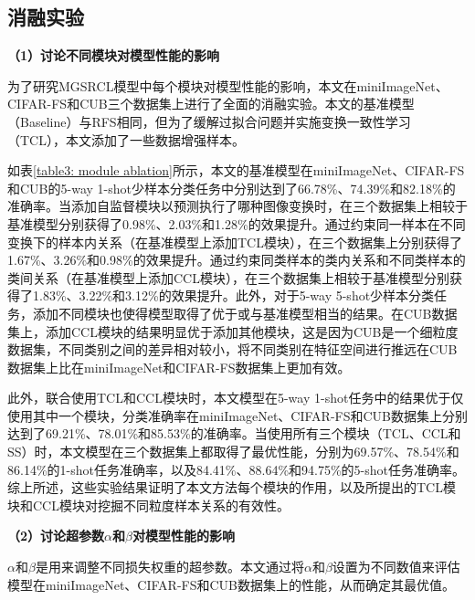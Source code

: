 \subsection[\hspace{-2pt}消融实验]{{\heiti{} \hspace{-8pt}消融实验}}\label{section3: 消融实验}

\textbf{（1）讨论不同模块对模型性能的影响}

为了研究MGSRCL模型中每个模块对模型性能的影响，本文在miniImageNet、CIFAR-FS和CUB三个数据集上进行了全面的消融实验。本文的基准模型（Baseline）与RFS\cite{RFS}相同，但为了缓解过拟合问题并实施变换一致性学习（TCL），本文添加了一些数据增强样本。

如表\ref{table3: module ablation}所示，本文的基准模型在miniImageNet、CIFAR-FS和CUB的5-way 1-shot少样本分类任务中分别达到了66.78\%、74.39\%和82.18\%的准确率。当添加自监督模块以预测执行了哪种图像变换时，在三个数据集上相较于基准模型分别获得了0.98\%、2.03\%和1.28\%的效果提升。通过约束同一样本在不同变换下的样本内关系（在基准模型上添加TCL模块），在三个数据集上分别获得了1.67\%、3.26\%和0.98\%的效果提升。通过约束同类样本的类内关系和不同类样本的类间关系（在基准模型上添加CCL模块），在三个数据集上相较于基准模型分别获得了1.83\%、3.22\%和3.12\%的效果提升。此外，对于5-way 5-shot少样本分类任务，添加不同模块也使得模型取得了优于或与基准模型相当的结果。在CUB数据集上，添加CCL模块的结果明显优于添加其他模块，这是因为CUB是一个细粒度数据集，不同类别之间的差异相对较小，将不同类别在特征空间进行推远在CUB数据集上比在miniImageNet和CIFAR-FS数据集上更加有效。

此外，联合使用TCL和CCL模块时，本文模型在5-way 1-shot任务中的结果优于仅使用其中一个模块，分类准确率在miniImageNet、CIFAR-FS和CUB数据集上分别达到了69.21\%、78.01\%和85.53\%的准确率。当使用所有三个模块（TCL、CCL和SS）时，本文模型在三个数据集上都取得了最优性能，分别为69.57\%、78.54\%和86.14\%的1-shot任务准确率，以及84.41\%、88.64\%和94.75\%的5-shot任务准确率。综上所述，这些实验结果证明了本文方法每个模块的作用，以及所提出的TCL模块和CCL模块对挖掘不同粒度样本关系的有效性。

\textbf{（2）讨论超参数$\alpha$和$\beta$对模型性能的影响}

$\alpha$和$\beta$是用来调整不同损失权重的超参数。本文通过将$\alpha$和$\beta$设置为不同数值来评估模型在miniImageNet、CIFAR-FS和CUB数据集上的性能，从而确定其最优值。

